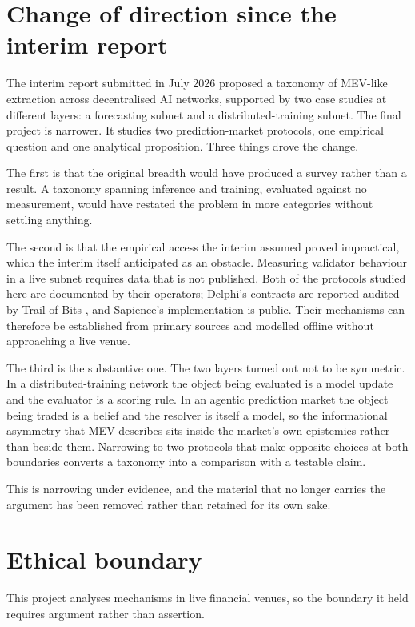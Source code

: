 \section{Change of direction since the interim report}
\label{sec:intro-change}

The interim report submitted in July 2026 proposed a taxonomy of MEV-like extraction across
decentralised AI networks, supported by two case studies at different layers: a forecasting
subnet and a distributed-training subnet. The final project is narrower. It studies two
prediction-market protocols, one empirical question and one analytical proposition. Three
things drove the change.

The first is that the original breadth would have produced a survey rather than a result. A
taxonomy spanning inference and training, evaluated against no measurement, would have
restated the problem in more categories without settling anything.

The second is that the empirical access the interim assumed proved impractical, which the
interim itself anticipated as an obstacle. Measuring validator behaviour in a live subnet
requires data that is not published. Both of the protocols studied here are documented by
their operators; Delphi's contracts are reported audited by Trail of Bits
\cite{gensyn2026delphi}, and Sapience's implementation is public. Their mechanisms can
therefore be established from primary sources and modelled offline without approaching a
live venue.

The third is the substantive one. The two layers turned out not to be symmetric. In a
distributed-training network the object being evaluated is a model update and the evaluator
is a scoring rule. In an agentic prediction market the object being traded is a belief and
the resolver is itself a model, so the informational asymmetry that MEV describes sits
inside the market's own epistemics rather than beside them. Narrowing to two protocols that
make opposite choices at both boundaries converts a taxonomy into a comparison with a
testable claim.

This is narrowing under evidence, and the material that no longer carries the argument has
been removed rather than retained for its own sake.

\section{Ethical boundary}
\label{sec:ethics-intro}

This project analyses mechanisms in live financial venues, so the boundary it held requires
argument rather than assertion.

